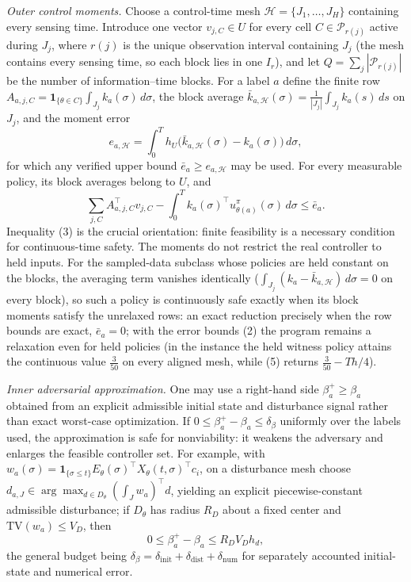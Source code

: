 \documentclass[10pt,twocolumn]{article}
\theoremstyle{plain}
\theoremstyle{definition}
\theoremstyle{remark}
\begin{document}
\emph{Outer control moments.} Choose a control-time mesh
\(\mathcal{H} = \{J_1,\dots,J_H\}\) containing every sensing time. Introduce
one vector \(v_{j,C} \in U\) for every cell \(C \in \mathcal{P}_{r(j)}\)
active during \(J_j\), where \(r(j)\) is the unique observation interval
containing \(J_j\) (the mesh contains every sensing time, so each block
lies in one \(I_r\)), and let \(Q = \sum_j |\mathcal{P}_{r(j)}|\) be the
number of information--time blocks. For a label \(a\) define the finite row
\(A_{a,j,C} = \mathbf{1}_{\{\theta \in C\}} \int_{J_j} k_a(\sigma)\, d\sigma\),
the block average
\(\bar{k}_{a,\mathcal{H}}(\sigma) = \frac{1}{|J_j|} \int_{J_j} k_a(s)\, ds\)
on \(J_j\), and the moment error
\[
e_{a,\mathcal{H}} = \int_0^T h_U\!\bigl(\bar{k}_{a,\mathcal{H}}(\sigma)
- k_a(\sigma)\bigr)\, d\sigma,
\tag{2}
\]
for which any verified upper bound \(\bar{e}_a \ge e_{a,\mathcal{H}}\) may be
used. For every measurable policy, its block averages belong to \(U\), and
\[
\sum_{j,C} A_{a,j,C}^\top v_{j,C} - \int_0^T k_a(\sigma)^\top
u^\pi_{\theta(a)}(\sigma)\, d\sigma \le \bar{e}_a.
\tag{3}
\]
Inequality (3) is the crucial orientation: finite feasibility is a
necessary condition for continuous-time safety. The moments do not restrict
the real controller to held inputs. For the sampled-data subclass whose policies are
held constant on the blocks, the averaging term vanishes identically
(\(\int_{J_j}(k_a - \bar{k}_{a,\mathcal{H}})\, d\sigma = 0\) on every
block), so such a policy is continuously safe exactly when its block
moments satisfy the unrelaxed rows: an exact reduction precisely when the
row bounds are exact, \(\bar{e}_a = 0\); with the error bounds (2) the
program remains a relaxation even for held policies (in the instance the
held witness policy attains the continuous value \(\tfrac3{50}\) on every
aligned mesh, while (5) returns \(\tfrac3{50} - Th/4\)).

\emph{Inner adversarial approximation.} One may use a right-hand side
\(\beta_a^{+} \ge \beta_a\) obtained from an explicit admissible initial
state and disturbance signal rather than exact worst-case optimization. If
\(0 \le \beta_a^{+} - \beta_a \le \delta_\beta\) uniformly over the labels
used, the approximation is safe for nonviability: it weakens the adversary
and enlarges the feasible controller set. For example, with
\(w_a(\sigma) = \mathbf{1}_{\{\sigma \le t\}}
E_\theta(\sigma)^\top X_\theta(t,\sigma)^\top c_i\), on a disturbance mesh
choose \(d_{a,J} \in \arg\max_{d \in D_\theta} (\int_J w_a)^\top d\),
yielding an explicit piecewise-constant admissible disturbance; if
\(D_\theta\) has radius \(R_D\) about a fixed center and
\(\mathrm{TV}(w_a) \le V_D\), then
\[
0 \le \beta_a^{+} - \beta_a \le R_D V_D h_d,
\tag{4}
\]
the general budget being \(\delta_\beta = \delta_{\mathrm{init}} +
\delta_{\mathrm{dist}} + \delta_{\mathrm{num}}\) for separately accounted
initial-state and numerical error.
\end{document}
